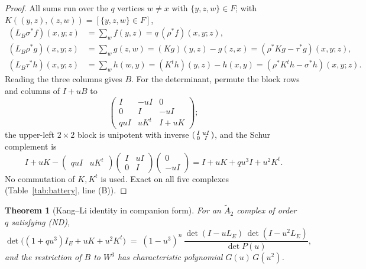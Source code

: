 \documentclass[11pt]{amsart}
\numberwithin{equation}{section}
\newtheorem{theorem}{Theorem}[section]
\theoremstyle{definition}
\theoremstyle{remark}
\newcommand{\LE}{L_E}
\newcommand{\LB}{L_B}
\newcommand{\Atwo}{\widetilde A_2}
\begin{document}
\begin{proof}
All sums run over the $q$ vertices $w\ne x$ with $\{y,z,w\}\in F$; with
$K((y,z),(z,w))=[\{y,z,w\}\in F]$,
\begin{align*}
(\LB\sigma^{*}f)(x,y;z)&=\textstyle\sum_{w}f(y,z)=q\,(\rho^{*}f)(x,y;z),\\
(\LB\rho^{*}g)(x,y;z)&=\textstyle\sum_{w}g(z,w)=(Kg)(y,z)-g(z,x)=(\rho^{*}Kg-\tau^{*}g)(x,y;z),\\
(\LB\tau^{*}h)(x,y;z)&=\textstyle\sum_{w}h(w,y)=(K^{t}h)(y,z)-h(x,y)=(\rho^{*}K^{t}h-\sigma^{*}h)(x,y;z).
\end{align*}
Reading the three columns gives $B$. For the determinant, permute the block rows and columns
of $I+uB$ to
\[
\begin{pmatrix}I&-uI&0\\0&I&-uI\\quI&uK^{t}&I+uK\end{pmatrix};
\]
the upper-left $2\times2$ block is unipotent with inverse
$\begin{psmallmatrix}I&uI\\0&I\end{psmallmatrix}$, and the Schur complement is
\[
I+uK-\begin{pmatrix}quI&uK^{t}\end{pmatrix}\begin{pmatrix}I&uI\\0&I\end{pmatrix}
\begin{pmatrix}0\\-uI\end{pmatrix}=I+uK+qu^{3}I+u^{2}K^{t}.
\]
No commutation of $K,K^{t}$ is used. Exact on all five complexes (Table~\ref{tab:battery},
line (B)).
\end{proof}

\begin{theorem}[Kang--Li identity in companion form]\label{thm:KLcomp}
For an $\Atwo$ complex of order $q$ satisfying {\rm(ND)},
\[
\det\bigl((1+qu^{3})I_E+uK+u^{2}K^{t}\bigr)\;=\;(1-u^{3})^{n}\,
\frac{\det(I-u\LE)\,\det(I-u^{2}\LE)}{\det P(u)} ,
\]
and the restriction of $B$ to $W^{3}$ has characteristic polynomial $G(u)\,G(u^{2})$.
\end{theorem}
\end{document}

